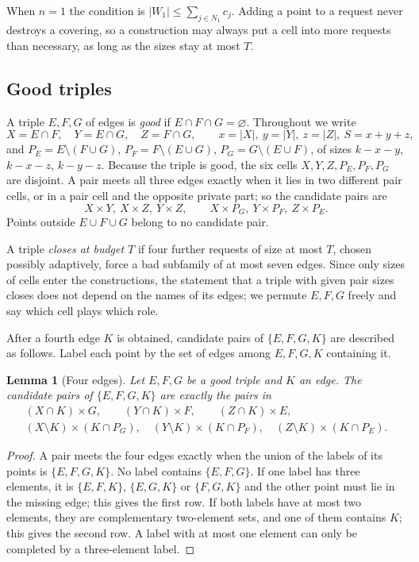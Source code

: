 \documentclass[11pt]{article}
\numberwithin{equation}{section}
\newtheorem{lemma}[theorem]{Lemma}
\theoremstyle{definition}
\theoremstyle{remark}
\begin{document}
When $n=1$ the condition is $|W_1|\le\sum_{j\in N_1}c_j$. Adding a
point to a request never destroys a covering, so a construction may
always put a cell into more requests than necessary, as long as the
sizes stay at most $T$.

\subsection{Good triples}
A triple $E,F,G$ of edges is \emph{good} if $E\cap F\cap G=\varnothing$.
Throughout we write
\[
 X=E\cap F,\quad Y=E\cap G,\quad Z=F\cap G,\qquad
 x=|X|,\ y=|Y|,\ z=|Z|,\ S=x+y+z,
\]
and $P_E=E\setminus(F\cup G)$, $P_F=F\setminus(E\cup G)$,
$P_G=G\setminus(E\cup F)$, of sizes $k-x-y$, $k-x-z$, $k-y-z$. Because
the triple is good, the six cells $X,Y,Z,P_E,P_F,P_G$ are disjoint.
A pair meets all three edges exactly when it lies in two different pair
cells, or in a pair cell and the opposite private part; so the candidate
pairs are
\begin{equation}\label{eq:triplecand}
 X\times Y,\ X\times Z,\ Y\times Z,\qquad
 X\times P_G,\ Y\times P_F,\ Z\times P_E .
\end{equation}
Points outside $E\cup F\cup G$ belong to no candidate pair.

A triple \emph{closes at budget $T$} if four further requests of size at
most $T$, chosen possibly adaptively, force a bad subfamily of at most
seven edges. Since only sizes of cells enter the constructions, the
statement that a triple with given pair sizes closes does not depend on
the names of its edges; we permute $E,F,G$ freely and say which cell
plays which role.

After a fourth edge $K$ is obtained, candidate pairs of $\{E,F,G,K\}$
are described as follows. Label each point by the set of edges among
$E,F,G,K$ containing it.

\begin{lemma}[Four edges]\label{lem:foursets}
Let $E,F,G$ be a good triple and $K$ an edge. The candidate pairs of
$\{E,F,G,K\}$ are exactly the pairs in
\begin{gather*}
 (X\cap K)\times G,\qquad (Y\cap K)\times F,\qquad (Z\cap K)\times E,\\
 (X\setminus K)\times(K\cap P_G),\quad
 (Y\setminus K)\times(K\cap P_F),\quad
 (Z\setminus K)\times(K\cap P_E).
\end{gather*}
\end{lemma}
\begin{proof}
A pair meets the four edges exactly when the union of the labels of its
points is $\{E,F,G,K\}$. No label contains $\{E,F,G\}$. If one label has
three elements, it is $\{E,F,K\}$, $\{E,G,K\}$ or $\{F,G,K\}$ and the
other point must lie in the missing edge; this gives the first row. If
both labels have at most two elements, they are complementary
two-element sets, and one of them contains $K$; this gives the second
row. A label with at most one element can only be completed by a
three-element label.
\end{proof}
\end{document}
